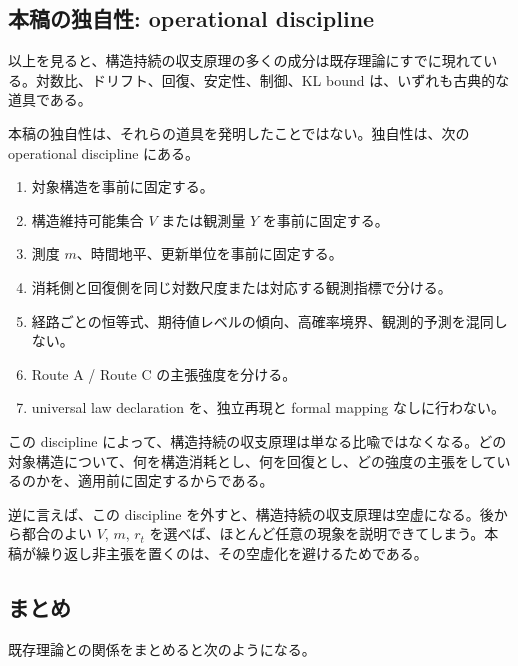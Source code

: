 \documentclass[12pt,a4paper]{article}
\begin{document}
\subsection{本稿の独自性: operational discipline}\label{ux672cux7a3fux306eux72ecux81eaux6027-operational-discipline}

以上を見ると、構造持続の収支原理の多くの成分は既存理論にすでに現れている。対数比、ドリフト、回復、安定性、制御、KL bound は、いずれも古典的な道具である。

本稿の独自性は、それらの道具を発明したことではない。独自性は、次の operational discipline にある。

\begin{enumerate}
\def\labelenumi{\arabic{enumi}.}
\tightlist
\item
  対象構造を事前に固定する。
\item
  構造維持可能集合 \(V\) または観測量 \(Y\) を事前に固定する。
\item
  測度 \(m\)、時間地平、更新単位を事前に固定する。
\item
  消耗側と回復側を同じ対数尺度または対応する観測指標で分ける。
\item
  経路ごとの恒等式、期待値レベルの傾向、高確率境界、観測的予測を混同しない。
\item
  Route A / Route C の主張強度を分ける。
\item
  universal law declaration を、独立再現と formal mapping なしに行わない。
\end{enumerate}

この discipline によって、構造持続の収支原理は単なる比喩ではなくなる。どの対象構造について、何を構造消耗とし、何を回復とし、どの強度の主張をしているのかを、適用前に固定するからである。

逆に言えば、この discipline を外すと、構造持続の収支原理は空虚になる。後から都合のよい \(V\), \(m\), \(r_{t}\) を選べば、ほとんど任意の現象を説明できてしまう。本稿が繰り返し非主張を置くのは、その空虚化を避けるためである。

\subsection{まとめ}\label{ux307eux3068ux3081}

既存理論との関係をまとめると次のようになる。
\end{document}
